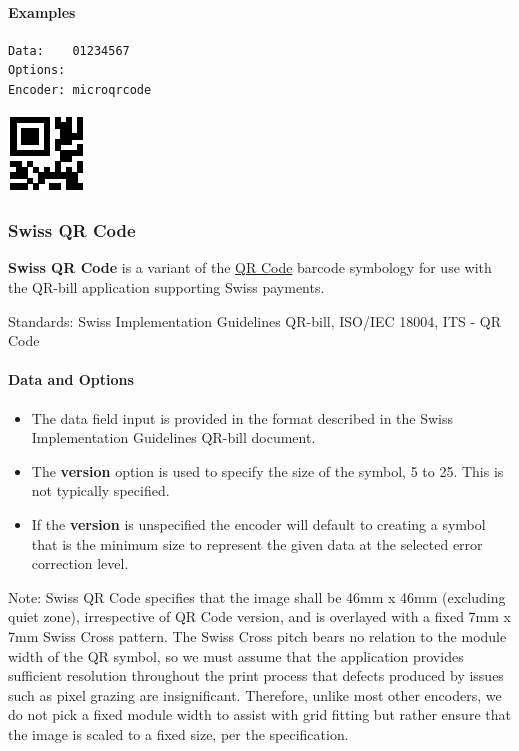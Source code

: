\hypertarget{examples-14}{%
\paragraph{Examples}\label{examples-14}}

\begin{verbatim}
Data:    01234567
Options: 
Encoder: microqrcode
\end{verbatim}

\includegraphics{images/qrcode-5.eps}

\hypertarget{swiss-qr-code}{%
\subsubsection{Swiss QR Code}\label{swiss-qr-code}}

\textbf{Swiss QR Code} is a variant of the
\protect\hyperlink{qr-code}{QR Code} barcode symbology for use with the
QR-bill application supporting Swiss payments.

Standards: Swiss Implementation Guidelines QR-bill, ISO/IEC 18004, ITS -
QR Code

\hypertarget{data-and-options-18}{%
\paragraph{Data and Options}\label{data-and-options-18}}

\begin{itemize}
\tightlist
\item
  The data field input is provided in the format described in the Swiss
  Implementation Guidelines QR-bill document.
\item
  The \textbf{version} option is used to specify the size of the symbol,
  5 to 25. This is not typically specified.
\item
  If the \textbf{version} is unspecified the encoder will default to
  creating a symbol that is the minimum size to represent the given data
  at the selected error correction level.
\end{itemize}

Note: Swiss QR Code specifies that the image shall be 46mm x 46mm
(excluding quiet zone), irrespective of QR Code version, and is
overlayed with a fixed 7mm x 7mm Swiss Cross pattern. The Swiss Cross
pitch bears no relation to the module width of the QR symbol, so we must
assume that the application provides sufficient resolution throughout
the print process that defects produced by issues such as pixel grazing
are insignificant. Therefore, unlike most other encoders, we do not pick
a fixed module width to assist with grid fitting but rather ensure that
the image is scaled to a fixed size, per the specification.

